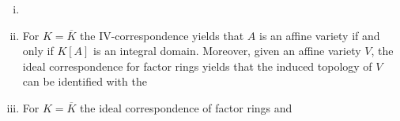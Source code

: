 	\begin{remark}
		\begin{enumerate}[(i)]
			\item{
			}
			\item{
				For $K = \overline{K}$ the IV-correspondence yields that $A$ is an affine variety if and only if $K[A]$ is an integral domain. Moreover, given an affine variety $V$, the ideal correspondence for factor rings yields that the induced topology of $V$ can be identified with the 
			}
			\item{
				For $K=\overline{K}$ the ideal correspondence of factor rings and 
			}
		\end{enumerate}
	\end{remark}

	\begin{theorem}

	\end{theorem}
